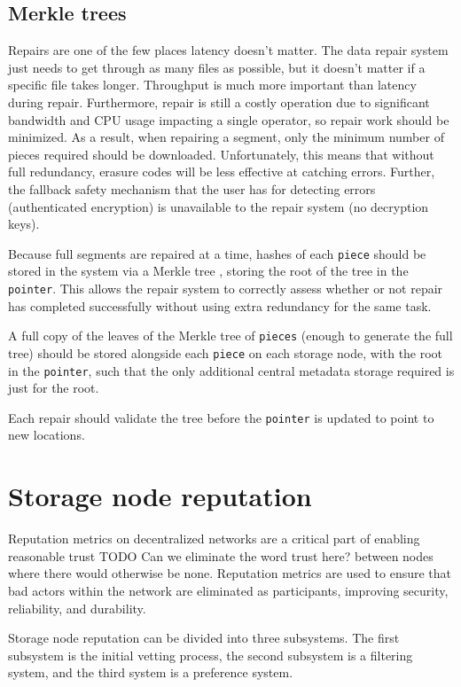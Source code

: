 \documentclass[11pt,fleqn,openany]{book}
\newcommand{\x}[1]{{\tt #1}} \newcommand{\code}[1]{{\tt #1}}
\newcommand{\todo}[1]{{\color{red} TODO #1 }}
\begin{document}
\subsection{Merkle trees}

Repairs are one of the few places latency doesn't matter. The data repair system
just needs to get through as many files as possible, but it doesn't matter if
a specific file takes longer. Throughput is much more important than
latency during repair. Furthermore, repair
is still a costly operation due to significant bandwidth and CPU usage
impacting a single operator, so repair work should be minimized.
As a result, when repairing a segment,
only the minimum number of pieces required should be downloaded.
Unfortunately, this means that
without full redundancy, erasure codes will be less effective at catching
errors. Further, the fallback safety mechanism that the user has for detecting
errors (authenticated encryption) is unavailable to the repair system (no
decryption keys).

Because full segments are repaired at a time, hashes of
each \x{piece} should be stored in the system via a Merkle tree
\cite{merkle-tree}, storing the root of the tree in the \x{pointer}. This allows
the repair system to correctly assess whether or not repair has completed
successfully without using extra redundancy for the same task.

A full copy of the leaves of the Merkle tree of \x{pieces} (enough to generate
the full tree) should be stored alongside each \x{piece} on each storage node,
with the root in the \x{pointer}, such that the only additional central
metadata storage required is just for the root.

Each repair should validate the tree before the \x{pointer} is updated to
point to new locations.

\section{Storage node reputation}

Reputation metrics on decentralized networks are a critical part of
enabling reasonable trust \todo{Can we eliminate the word trust here?}
between nodes
where there would otherwise be none. Reputation metrics
are used to ensure that bad actors
within the network are eliminated as participants, improving security,
reliability, and durability.

Storage node reputation can be divided into three subsystems. The first
subsystem is the initial vetting process, the second subsystem is a filtering
system, and the third system is a preference system.
\end{document}
